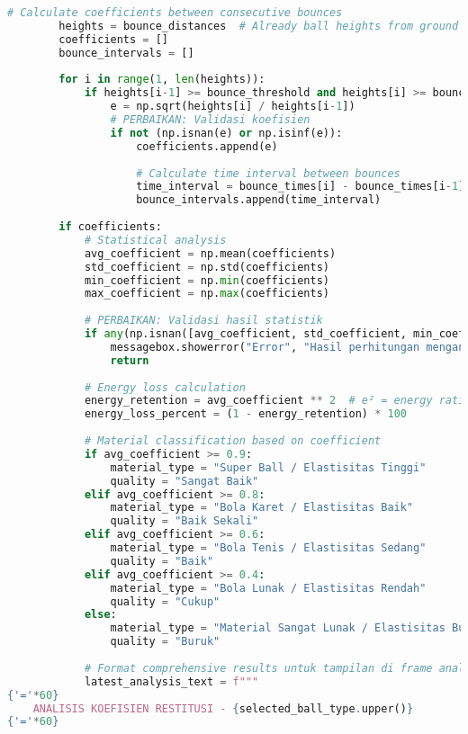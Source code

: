 \begin{itemize}
\begin{scriptsize}
\begin{lstlisting}[language=python]
        # Calculate coefficients between consecutive bounces
        heights = bounce_distances  # Already ball heights from ground
        coefficients = []
        bounce_intervals = []
        
        for i in range(1, len(heights)):
            if heights[i-1] >= bounce_threshold and heights[i] >= bounce_threshold:  # PERBAIKAN: Validasi kedua ketinggian
                e = np.sqrt(heights[i] / heights[i-1])
                # PERBAIKAN: Validasi koefisien
                if not (np.isnan(e) or np.isinf(e)):
                    coefficients.append(e)
                    
                    # Calculate time interval between bounces
                    time_interval = bounce_times[i] - bounce_times[i-1]
                    bounce_intervals.append(time_interval)
        
        if coefficients:
            # Statistical analysis
            avg_coefficient = np.mean(coefficients)
            std_coefficient = np.std(coefficients)
            min_coefficient = np.min(coefficients)
            max_coefficient = np.max(coefficients)
            
            # PERBAIKAN: Validasi hasil statistik
            if any(np.isnan([avg_coefficient, std_coefficient, min_coefficient, max_coefficient])):
                messagebox.showerror("Error", "Hasil perhitungan mengandung nilai tidak valid")
                return
            
            # Energy loss calculation
            energy_retention = avg_coefficient ** 2  # e² = energy ratio
            energy_loss_percent = (1 - energy_retention) * 100
            
            # Material classification based on coefficient
            if avg_coefficient >= 0.9:
                material_type = "Super Ball / Elastisitas Tinggi"
                quality = "Sangat Baik"
            elif avg_coefficient >= 0.8:
                material_type = "Bola Karet / Elastisitas Baik"
                quality = "Baik Sekali"
            elif avg_coefficient >= 0.6:
                material_type = "Bola Tenis / Elastisitas Sedang"
                quality = "Baik"
            elif avg_coefficient >= 0.4:
                material_type = "Bola Lunak / Elastisitas Rendah"
                quality = "Cukup"
            else:
                material_type = "Material Sangat Lunak / Elastisitas Buruk"
                quality = "Buruk"
            
            # Format comprehensive results untuk tampilan di frame analisis
            latest_analysis_text = f"""
{'='*60}
    ANALISIS KOEFISIEN RESTITUSI - {selected_ball_type.upper()}
{'='*60}


\end{lstlisting}
\end{scriptsize}
\end{itemize}
